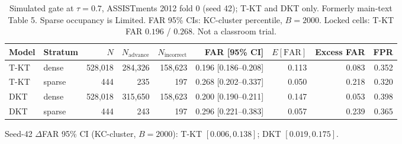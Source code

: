 \begin{table}[htbp]
\caption{Simulated gate at $\tau=0.7$, ASSISTments 2012 fold 0 (seed 42); T-KT and DKT only. Formerly main-text Table 5. Sparse occupancy is Limited. FAR 95\% CIs: KC-cluster percentile, $B=2000$. Locked cells: T-KT FAR $0.196$ / $0.268$. Not a classroom trial.}
\label{tab:s5_seed42_far}
\centering
\small
\begin{tabular}{llrrrrrrr}
\toprule
Model & Stratum & $N$ & $N_{\mathrm{advance}}$ & $N_{\mathrm{incorrect}}$ & FAR [95\% CI] & $E[\mathrm{FAR}]$ & Excess FAR & FPR \\
\midrule
T-KT & dense & 528{,}018 & 284{,}326 & 158{,}623 & 0.196 [0.186--0.208] & 0.113 & 0.083 & 0.352 \\
T-KT & sparse & 444 & 235 & 197 & 0.268 [0.202--0.337] & 0.050 & 0.218 & 0.320 \\
DKT & dense & 528{,}018 & 315{,}650 & 158{,}623 & 0.200 [0.190--0.211] & 0.147 & 0.053 & 0.398 \\
DKT & sparse & 444 & 243 & 197 & 0.296 [0.221--0.383] & 0.057 & 0.239 & 0.365 \\
\bottomrule
\end{tabular}

\vspace{0.4em}
{\footnotesize Seed-42 $\Delta$FAR 95\% CI (KC-cluster, $B=2000$): T-KT $[0.006, 0.138]$; DKT $[0.019, 0.175]$.}
\end{table}
